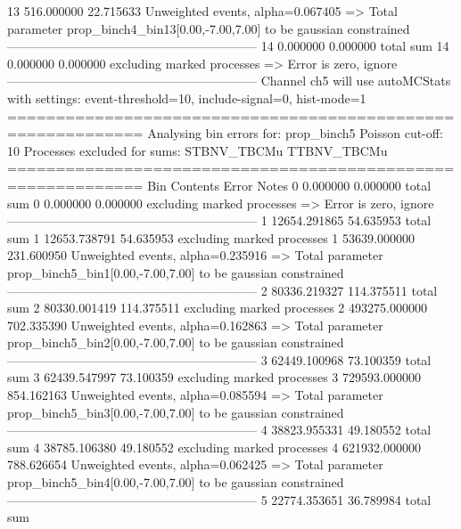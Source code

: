 13         516.000000      22.715633       Unweighted events, alpha=0.067405
  => Total parameter prop_binch4_bin13[0.00,-7.00,7.00] to be gaussian constrained
------------------------------------------------------------
14         0.000000        0.000000        total sum                     
14         0.000000        0.000000        excluding marked processes    
  => Error is zero, ignore      
------------------------------------------------------------
Channel ch5 will use autoMCStats with settings: event-threshold=10, include-signal=0, hist-mode=1
============================================================
Analysing bin errors for: prop_binch5
Poisson cut-off: 10
Processes excluded for sums: STBNV_TBCMu TTBNV_TBCMu
============================================================
Bin        Contents        Error           Notes                         
0          0.000000        0.000000        total sum                     
0          0.000000        0.000000        excluding marked processes    
  => Error is zero, ignore      
------------------------------------------------------------
1          12654.291865    54.635953       total sum                     
1          12653.738791    54.635953       excluding marked processes    
1          53639.000000    231.600950      Unweighted events, alpha=0.235916
  => Total parameter prop_binch5_bin1[0.00,-7.00,7.00] to be gaussian constrained
------------------------------------------------------------
2          80336.219327    114.375511      total sum                     
2          80330.001419    114.375511      excluding marked processes    
2          493275.000000   702.335390      Unweighted events, alpha=0.162863
  => Total parameter prop_binch5_bin2[0.00,-7.00,7.00] to be gaussian constrained
------------------------------------------------------------
3          62449.100968    73.100359       total sum                     
3          62439.547997    73.100359       excluding marked processes    
3          729593.000000   854.162163      Unweighted events, alpha=0.085594
  => Total parameter prop_binch5_bin3[0.00,-7.00,7.00] to be gaussian constrained
------------------------------------------------------------
4          38823.955331    49.180552       total sum                     
4          38785.106380    49.180552       excluding marked processes    
4          621932.000000   788.626654      Unweighted events, alpha=0.062425
  => Total parameter prop_binch5_bin4[0.00,-7.00,7.00] to be gaussian constrained
------------------------------------------------------------
5          22774.353651    36.789984       total sum                     
